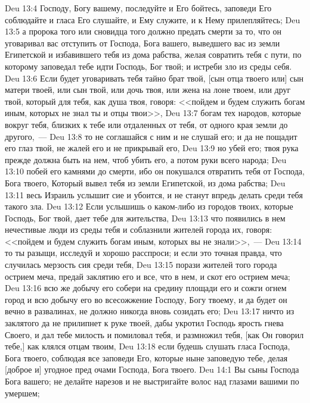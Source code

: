 \vs Deu 13:4 Господу, Богу вашему, последуйте и Его бойтесь, заповеди Его соблюдайте и гласа Его слушайте, и Ему служите, и к Нему прилепляйтесь;
\vs Deu 13:5 а пророка того или сновидца того должно предать смерти за то, что он уговаривал вас отступить от Господа, Бога вашего, выведшего вас из земли Египетской и избавившего тебя из дома рабства, желая совратить тебя с пути, по которому заповедал тебе идти Господь, Бог твой; и  истреби зло из среды себя.
\vs Deu 13:6 Если будет уговаривать тебя тайно брат твой, [сын отца твоего или] сын матери твоей, или сын твой, или дочь твоя, или жена на лоне твоем, или друг твой, который для тебя, как душа твоя, говоря: <<пойдем и будем служить богам иным, которых не знал ты и отцы твои>>,
\vs Deu 13:7 богам тех народов, которые вокруг тебя, близких к тебе или отдаленных от тебя, от одного края земли до другого,~---
\vs Deu 13:8 то не соглашайся с ним и не слушай его; и да не пощадит его глаз твой, не жалей его и не прикрывай его,
\vs Deu 13:9 но убей его; твоя рука прежде  должна быть на нем, чтоб убить его, а потом руки всего народа;
\vs Deu 13:10 побей его камнями до смерти, ибо он покушался отвратить тебя от Господа, Бога твоего, Который вывел тебя из земли Египетской, из дома рабства;
\vs Deu 13:11 весь Израиль услышит сие и убоится, и не станут впредь делать среди тебя такого зла.
\vs Deu 13:12 Если услышишь о каком-либо из городов твоих, которые Господь, Бог твой, дает тебе для жительства,
\vs Deu 13:13 что появились в нем нечестивые люди из среды тебя и соблазнили жителей города их, говоря: <<пойдем и будем служить богам иным, которых вы не знали>>,~---
\vs Deu 13:14 то ты разыщи, исследуй и хорошо расспроси; и если это точная правда, что случилась мерзость сия среди тебя,
\vs Deu 13:15 порази жителей того города острием меча, предай заклятию его и все, что в нем, и скот его  острием меча;
\vs Deu 13:16 всю же добычу его собери на средину площади его и сожги огнем город и всю добычу его во всесожжение Господу, Богу твоему, и да будет он вечно в развалинах, не должно никогда вновь созидать его;
\vs Deu 13:17 ничто из заклятого да не прилипнет к руке твоей, дабы укротил Господь ярость гнева Своего, и дал тебе милость и помиловал тебя, и размножил тебя, [как Он говорил тебе,] как клялся отцам твоим,
\vs Deu 13:18 если будешь слушать гласа Господа, Бога твоего, соблюдая все заповеди Его, которые ныне заповедую тебе, делая [доброе и] угодное пред очами Господа, Бога твоего.
\vs Deu 14:1 Вы сыны Господа Бога вашего; не делайте нарезов  и не выстригайте волос над глазами вашими по умершем;
